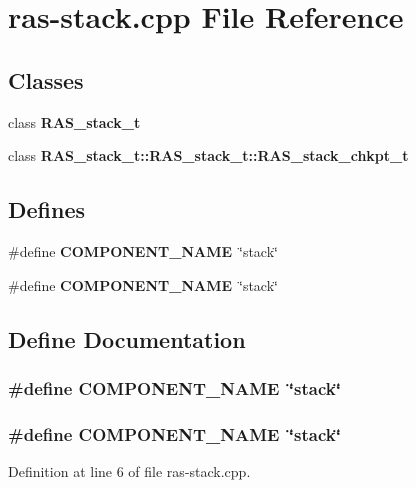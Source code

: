 \section{ras-stack.cpp File Reference}
\label{ras-stack_8cpp}
\subsection*{Classes}
\begin{CompactItemize}
\item 
class {\bf RAS\_\-stack\_\-t}
\item 
class {\bf RAS\_\-stack\_\-t::RAS\_\-stack\_\-t::RAS\_\-stack\_\-chkpt\_\-t}
\end{CompactItemize}
\subsection*{Defines}
\begin{CompactItemize}
\item 
\#define {\bf COMPONENT\_\-NAME}~\char`\"{}stack\char`\"{}
\item 
\#define {\bf COMPONENT\_\-NAME}~\char`\"{}stack\char`\"{}
\end{CompactItemize}


\subsection{Define Documentation}
\subsubsection[{COMPONENT\_\-NAME}]{\setlength{\rightskip}{0pt plus 5cm}\#define COMPONENT\_\-NAME~\char`\"{}stack\char`\"{}}\label{zesto-bpred_8cpp_9146ade7ce24e3db226a973a59063892}


\subsubsection[{COMPONENT\_\-NAME}]{\setlength{\rightskip}{0pt plus 5cm}\#define COMPONENT\_\-NAME~\char`\"{}stack\char`\"{}}\label{ras-stack_8cpp_9146ade7ce24e3db226a973a59063892}




Definition at line 6 of file ras-stack.cpp.